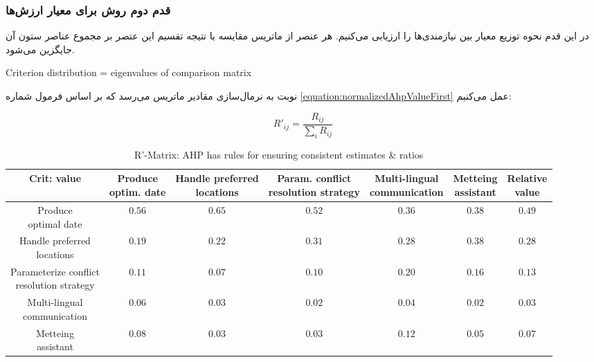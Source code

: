 \subsubsection{قدم دوم روش  برای معیار ارزش‌ها}

در این قدم نحوه توزیع معیار بین نیازمندی‌ها را ارزیابی می‌کنیم. هر عنصر از
ماتریس مقایسه با نتیجه تقسیم این عتصر بر مجموع عناصر ستون آن جایگزین می‌شود.

\begin{LTR}
    Criterion distribution = eigenvalues of comparison matrix
\end{LTR}

نوبت به نرمال‌سازی مقادیر ماتریس می‌رسد که بر اساس فرمول شماره
\ref{equation:normalizedAhpValueFirst} عمل می‌کنیم:

\begin{equation}
    R'_{ij} = \frac{R_{ij}}{\sum_{i}R_{ij}} 
    \label{equation:normalizedAhpValueFirst}
\end{equation}

\begin{LTR}
    \begin{table}[H]
        \centering
        \begin{tabular}{ccccccc} Crit: value & \makecell{Produce \\ optim. date} & \makecell{Handle preferred \\ locations} & \makecell{Param. conflict \\ resolution strategy} & \makecell{Multi-lingual \\ communication} & \makecell{Metteing \\ assistant} & \makecell{Relative \\ value} \\ \hline
            \makecell{Produce \\ optimal date} & $0.56$ & $0.65$ & $0.52$ & $0.36$ & $0.38$ & $0.49$ \\ \hline
            \makecell{Handle preferred \\ locations} & $0.19$ & $0.22$ & $0.31$ & $0.28$ & $0.38$ & $0.28$ \\ \hline
            \makecell{Parameterize conflict \\ resolution strategy} & $0.11$ & $0.07$ & $0.10$ & $0.20$ & $0.16$ & $0.13$ \\ \hline
            \makecell{Multi-lingual \\ communication} & $0.06$ & $0.03$ & $0.02$ & $0.04$ & $0.02$ & $0.03$ \\ \hline
            \makecell{Metteing \\ assistant} & $0.08$ & $0.03$ & $0.03$ & $0.12$ & $0.05$ & $0.07$ \\
        \end{tabular}
        \caption{R'-Matrix: AHP has rules for ensuring consistent estimates \&
        ratios}
        \label{fig:ahpValueStep2}
    \end{table}
\end{LTR}

